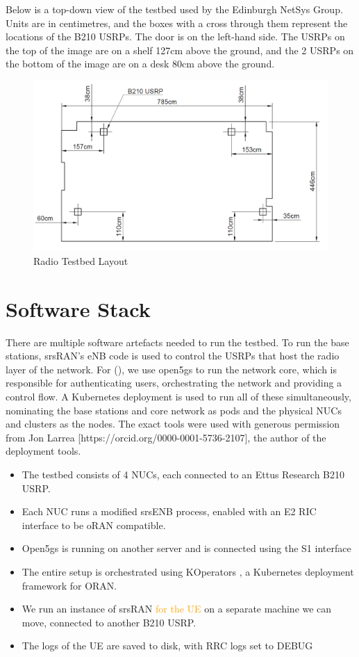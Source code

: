 Below is a top-down view of the testbed used by the Edinburgh NetSys Group. Units are in centimetres, and the boxes with a cross through them represent the locations of the B210 USRPs. The door is on the left-hand side. The USRPs on the top of the image are on a shelf 127cm above the ground, and the 2 USRPs on the bottom of the image are on a desk 80cm above the ground.

\begin{figure}[!h]
    \centering
    \includegraphics[width=1\linewidth]{src//img/room117tesbed.png}
    \caption{Radio Testbed Layout}
    \label{fig:appendix:testbed-drawing}
\end{figure}

\section{Software Stack} \label{sec:research-software-stack}
There are multiple software artefacts needed to run the testbed. To run the base stations, srsRAN's eNB code is used to control the USRPs that host the radio layer of the network. For (), we use open5gs to run the network core, which is responsible for authenticating users, orchestrating the network and providing a control flow. A Kubernetes \insertref deployment is used to run all of these simultaneously, nominating the base stations and core network as pods and the physical NUCs and clusters as the nodes. The exact tools were used with generous permission from Jon Larrea [https://orcid.org/0000-0001-5736-2107], the author of the deployment tools.
\begin{itemize}
    \item The testbed consists of 4 NUCs, each connected to an Ettus Research B210 USRP. 
    \item Each NUC runs a modified srsENB process, enabled with an E2 RIC interface to be oRAN compatible. 
    \item Open5gs is running on another server and is connected using the S1 interface
    \item The entire setup is orchestrated using KOperators , a Kubernetes deployment framework for ORAN.
    \item We run an instance of srsRAN \textcolor{orange}{for the UE} on a separate machine we can move, connected to another B210 USRP.
    \item The logs of the UE are saved to disk, with RRC logs set to DEBUG
\end{itemize}

